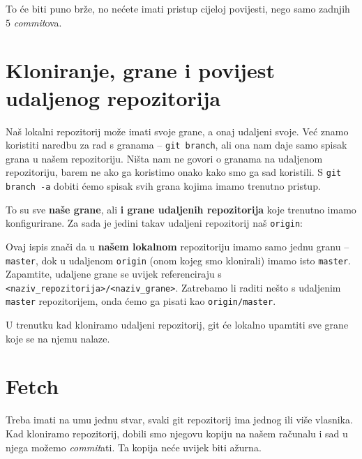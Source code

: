 
To će biti puno brže, no nećete imati pristup cijeloj povijesti, nego samo zadnjih $5$ \emph{commit}ova.

\section*{Kloniranje, grane i povijest udaljenog repozitorija}

Naš lokalni repozitorij može imati svoje grane, a onaj udaljeni svoje.
Već znamo koristiti naredbu za rad s granama -- \verb+git branch+, ali ona nam daje samo spisak grana u našem repozitoriju.
Ništa nam ne govori o granama na udaljenom repozitoriju, barem ne ako ga koristimo onako kako smo ga sad koristili.
S \verb+git branch -a+ dobiti ćemo spisak svih grana kojima imamo trenutno pristup.

To su sve \textbf{naše grane}, ali \textbf{i grane udaljenih repozitorija} koje trenutno imamo konfigurirane.
Za sada je jedini takav udaljeni repozitorij naš \verb+origin+:



Ovaj ispis znači da u \textbf{našem lokalnom} repozitoriju imamo samo jednu granu -- \verb+master+, dok u udaljenom \verb+origin+ (onom kojeg smo klonirali) imamo isto \verb+master+.
Zapamtite, udaljene grane se uvijek referenciraju s \verb+<naziv_repozitorija>/<naziv_grane>+. 
Zatrebamo li raditi nešto s udaljenim \verb+master+ repozitorijem, onda ćemo ga pisati kao \verb+origin/master+.

U trenutku kad kloniramo udaljeni repozitorij, git će lokalno upamtiti sve grane koje se na njemu nalaze.

%

\section*{Fetch}

Treba imati na umu jednu stvar, svaki git repozitorij ima jednog ili više vlasnika.
Kad kloniramo repozitorij, dobili smo njegovu kopiju na našem računalu i sad u njega možemo \emph{commit}ati.
Ta kopija neće uvijek biti ažurna.



